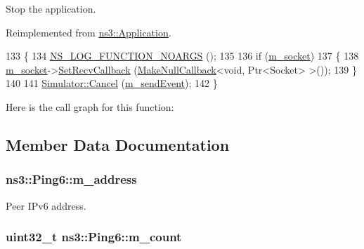 Stop the application. 



Reimplemented from \hyperlink{classns3_1_1Application_aea844f3c114b1faf8de1faf5127ea8b4}{ns3\+::\+Application}.


\begin{DoxyCode}
133 \{
134   \hyperlink{log-macros-disabled_8h_a8f7e4afc291c9d29a65c18ac1f79197b}{NS\_LOG\_FUNCTION\_NOARGS} ();
135 
136   \textcolor{keywordflow}{if} (\hyperlink{classns3_1_1Ping6_a906684b14d88122f2a16b4a9d241194d}{m\_socket})
137     \{
138       \hyperlink{classns3_1_1Ping6_a906684b14d88122f2a16b4a9d241194d}{m\_socket}->\hyperlink{classns3_1_1Socket_a243f7835ef1a85f9270fd3577e3a40da}{SetRecvCallback} (\hyperlink{group__makenullcallback_ga7e3cd6816f63ea9112c04b0086c2c65a}{MakeNullCallback}<\textcolor{keywordtype}{void}, Ptr<Socket> 
      >());
139     \}
140 
141   \hyperlink{classns3_1_1Simulator_a1b903a62d6117ef28f7ba3c6500689bf}{Simulator::Cancel} (\hyperlink{classns3_1_1Ping6_a4a3a1991d21fbcc690af300d303ee552}{m\_sendEvent});
142 \}
\end{DoxyCode}


Here is the call graph for this function\+:




\subsection{Member Data Documentation}
\subsubsection[{\texorpdfstring{m\+\_\+address}{m_address}}]{ ns3\+::\+Ping6\+::m\+\_\+address\hspace{0.3cm}{\ttfamily [private]}}\hypertarget{classns3_1_1Ping6_a90705c6c52b848a90e920a6a3e53c64c}{}\label{classns3_1_1Ping6_a90705c6c52b848a90e920a6a3e53c64c}


Peer I\+Pv6 address. 

\subsubsection[{\texorpdfstring{m\+\_\+count}{m_count}}]{\setlength{\rightskip}{0pt plus 5cm}uint32\+\_\+t ns3\+::\+Ping6\+::m\+\_\+count\hspace{0.3cm}{\ttfamily [private]}}\hypertarget{classns3_1_1Ping6_a7a42b5561b73f3923bee2dcc204e5667}{}\label{classns3_1_1Ping6_a7a42b5561b73f3923bee2dcc204e5667}


